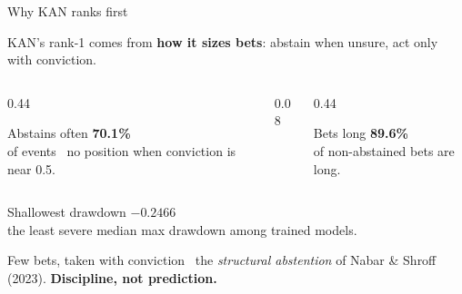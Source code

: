 \documentclass[aspectratio=169, t]{beamer}
\begin{document}
\begin{frame}{Why KAN ranks first}
\vspace{-0.6em}

{\footnotesize KAN's rank-1 comes from \textbf{how it sizes bets}: abstain when unsure, act only with conviction.}

\vspace{0.8em}

\begin{columns}[c]
\begin{column}{0.44\textwidth}
{
\begin{block}{Abstains often}
\centering
{\Large\bfseries\color{isegred} 70.1\%}\\[2pt]
{\scriptsize of events \textemdash\ no position when conviction is near 0.5.}
\end{block}
}
\end{column}
\begin{column}{0.08\textwidth}\hfill\end{column}
\begin{column}{0.44\textwidth}
{
\begin{block}{Bets long}
\centering
{\Large\bfseries\color{isegred} 89.6\%}\\[2pt]
{\scriptsize of non-abstained bets are long.}
\end{block}
}
\end{column}
\end{columns}

\vspace{0.9em}

\begin{center}
\begin{minipage}{0.60\textwidth}
{
\begin{block}{Shallowest drawdown}
\centering
{\Large\bfseries\color{isegred} $-0.2466$}\\[2pt]
{\scriptsize the least severe median max drawdown among trained models.}
\end{block}
}
\end{minipage}
\end{center}

\vspace{0.9em}

\centering
{\scriptsize Few bets, taken with conviction \textemdash\ the \emph{structural abstention} of Nabar \& Shroff (2023). \textbf{Discipline, not prediction.}}

\end{frame}
\end{document}
